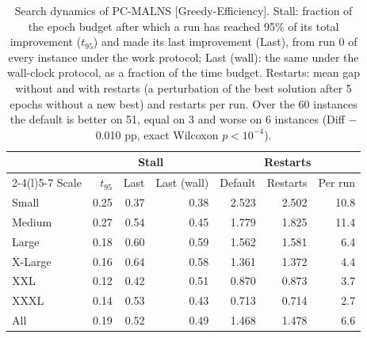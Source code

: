\begin{table}[pos=H]
\centering
\caption{Search dynamics of PC-MALNS [Greedy-Efficiency]. Stall: fraction of the epoch budget after which a run has reached 95\% of its total improvement ($t_{95}$) and made its last improvement (Last), from run 0 of every instance under the work protocol; Last (wall): the same under the wall-clock protocol, as a fraction of the time budget. Restarts: mean gap without and with restarts (a perturbation of the best solution after 5 epochs without a new best) and restarts per run. Over the 60 instances the default is better on 51, equal on 3 and worse on 6 instances (Diff $-$0.010 pp, exact Wilcoxon $p < 10^{-4}$).}
\label{tab:dynamics}
\footnotesize
\begin{tabular}{@{}lrrrrrr@{}}
\toprule
 & \multicolumn{3}{c}{Stall} & \multicolumn{3}{c}{Restarts} \\
\cmidrule(lr){2-4}\cmidrule(l){5-7}
Scale & $t_{95}$ & Last & Last (wall) & Default & Restarts & Per run \\
\midrule
Small & 0.25 & 0.37 & 0.38 & 2.523 & 2.502 & 10.8 \\
Medium & 0.27 & 0.54 & 0.45 & 1.779 & 1.825 & 11.4 \\
Large & 0.18 & 0.60 & 0.59 & 1.562 & 1.581 & 6.4 \\
X-Large & 0.16 & 0.64 & 0.58 & 1.361 & 1.372 & 4.4 \\
XXL & 0.12 & 0.42 & 0.51 & 0.870 & 0.873 & 3.7 \\
XXXL & 0.14 & 0.53 & 0.43 & 0.713 & 0.714 & 2.7 \\
All & 0.19 & 0.52 & 0.49 & 1.468 & 1.478 & 6.6 \\
\bottomrule
\end{tabular}
\end{table}
